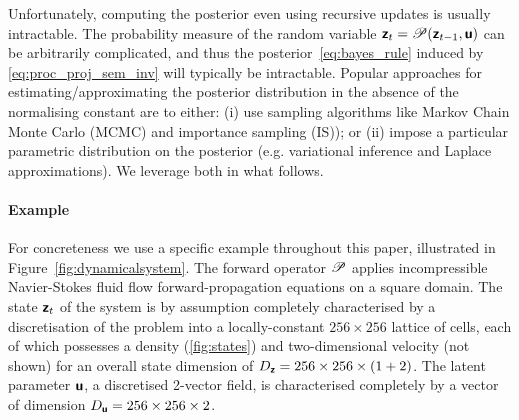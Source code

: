 \documentclass{article}
\theoremstyle{plain}
\theoremstyle{definition}
\theoremstyle{remark}
\begin{document}
Unfortunately, computing the posterior even using recursive updates is usually intractable.
The %
probability measure of the random variable $\boldsymbol{\mathsf{z}}_t = \mathscr{P}(\boldsymbol{\mathsf{z}}_{t-1}, \boldsymbol{\mathsf{u}})$  can be arbitrarily complicated, and thus the posterior~\eqref{eq:bayes_rule} induced by \eqref{eq:proc_proj_sem_inv} will typically be intractable.
Popular approaches for estimating/approximating the posterior distribution in the absence of the normalising constant are to either: (i) use sampling algorithms like Markov Chain Monte Carlo (MCMC) and importance sampling (IS)); or (ii) impose a particular parametric distribution on the posterior (e.g. variational inference and Laplace approximations).
We leverage both in what follows.

\paragraph{Example} For concreteness we use a specific example throughout this paper, illustrated in  Figure~\ref{fig:dynamicalsystem}.
The forward operator $\mathscr{P}$ applies incompressible Navier-Stokes fluid flow forward-propagation equations on a square domain.
The state $\boldsymbol{\mathsf{z}}_t$ of the system is by assumption completely characterised by a discretisation of the problem into a locally-constant \(256\times 256\) lattice of cells, each of which possesses a density (\ref{fig:states}) and two-dimensional velocity (not shown) for an overall state dimension of \(D_{\boldsymbol{\mathsf{z}}}=256\times 256 \times (1+2)\).
The latent parameter $\boldsymbol{\mathsf{u}}$, a discretised 2-vector field, is characterised completely by a vector of dimension \(D_{\boldsymbol{\mathsf{u}}}=256\times 256 \times 2\).
\end{document}
